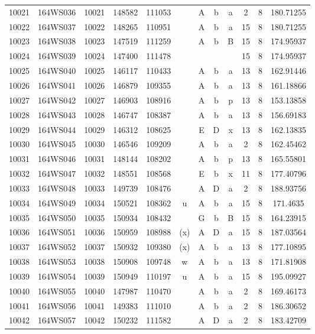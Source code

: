 \begin{tabular}{|*{12}{c|}}
10021 & 164WS036 & 10021 & 148582 & 111053 &  & A & b & a & 2 & 8 & 180.71255 \\ 
10022 & 164WS037 & 10022 & 148265 & 110951 &  & A & b & a & 15 & 8 & 180.71255 \\ 
10023 & 164WS038 & 10023 & 147519 & 111259 &  & A & b & B & 15 & 8 & 174.95937 \\ 
10024 & 164WS039 & 10024 & 147400 & 111478 &  &  &  &  & 15 & 8 & 174.95937 \\ 
10025 & 164WS040 & 10025 & 146117 & 110433 &  & A & b & a & 13 & 8 & 162.91446 \\ 
10026 & 164WS041 & 10026 & 146879 & 109355 &  & A & b & a & 13 & 8 & 161.18866 \\ 
10027 & 164WS042 & 10027 & 146903 & 108916 &  & A & b & p & 13 & 8 & 153.13858 \\ 
10028 & 164WS043 & 10028 & 146747 & 108387 &  & A & b & a & 13 & 8 & 156.69183 \\ 
10029 & 164WS044 & 10029 & 146312 & 108625 &  & E & D & x & 13 & 8 & 162.13835 \\ 
10030 & 164WS045 & 10030 & 146546 & 109209 &  & A & b & a & 2 & 8 & 162.45462 \\ 
10031 & 164WS046 & 10031 & 148144 & 108202 &  & A & b & p & 13 & 8 & 165.55801 \\ 
10032 & 164WS047 & 10032 & 148551 & 108568 &  & E & b & x & 11 & 8 & 177.40796 \\ 
10033 & 164WS048 & 10033 & 149739 & 108476 &  & A & D & a & 2 & 8 & 188.93756 \\ 
10034 & 164WS049 & 10034 & 150521 & 108362 & u & A & b & a & 15 & 8 & 171.4635 \\ 
10035 & 164WS050 & 10035 & 150934 & 108432 &  & G & b & B & 15 & 8 & 164.23915 \\ 
10036 & 164WS051 & 10036 & 150959 & 108988 & (x) & A & D & a & 15 & 8 & 187.03564 \\ 
10037 & 164WS052 & 10037 & 150932 & 109380 & (x) & A & b & a & 13 & 8 & 177.10895 \\ 
10038 & 164WS053 & 10038 & 150908 & 109748 & w & A & b & a & 13 & 8 & 171.81908 \\ 
10039 & 164WS054 & 10039 & 150949 & 110197 & u & A & b & a & 15 & 8 & 195.09927 \\ 
10040 & 164WS055 & 10040 & 147987 & 110470 &  & A & b & a & 2 & 8 & 169.46173 \\ 
10041 & 164WS056 & 10041 & 149383 & 111010 &  & A & b & a & 2 & 8 & 186.30652 \\ 
10042 & 164WS057 & 10042 & 150232 & 111582 &  & A & D & a & 2 & 8 & 183.42709 \\ 

\end{tabular}
